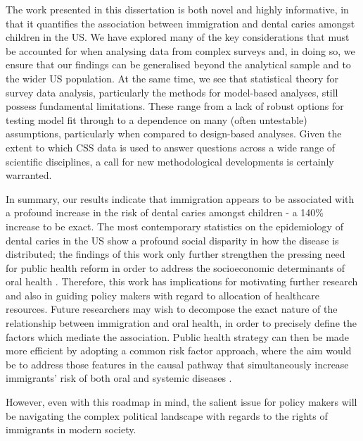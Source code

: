 The work presented in this dissertation is both novel and highly informative, in that it quantifies the association between immigration and dental caries amongst children in the US. We have explored many of the key considerations that must be accounted for when analysing data from complex surveys and, in doing so, we ensure that our findings can be generalised beyond the analytical sample and to the wider US population. At the same time, we see that statistical theory for survey data analysis, particularly the methods for model-based analyses, still possess fundamental limitations. These range from a lack of robust options for testing model fit through to a dependence on many (often untestable) assumptions, particularly when compared to design-based analyses. Given the extent to which CSS data is used to answer questions across a wide range of scientific disciplines, a call for new methodological developments is certainly warranted.

In summary, our results indicate that immigration appears to be associated with a profound increase in the risk of dental caries amongst children - a 140\% increase to be exact. The most contemporary statistics on the epidemiology of dental caries in the US show a profound social disparity in how the disease is distributed; the findings of this work only further strengthen the pressing need for public health reform in order to address the socioeconomic determinants of oral health \citep{bashir2021, bashir2022}. Therefore, this work has implications for motivating further research and also in guiding policy makers with regard to allocation of healthcare resources. Future researchers may wish to decompose the exact nature of the relationship between immigration and oral health, in order to precisely define the factors which mediate the association. Public health strategy can then be made more efficient by adopting a common risk factor approach, where the aim would be to address those features in the causal pathway that simultaneously increase immigrants' risk of both oral and systemic diseases \citep{sheiham2000}. 

However, even with this roadmap in mind, the salient issue for policy makers will be navigating the complex political landscape with regards to the rights of immigrants in modern society.